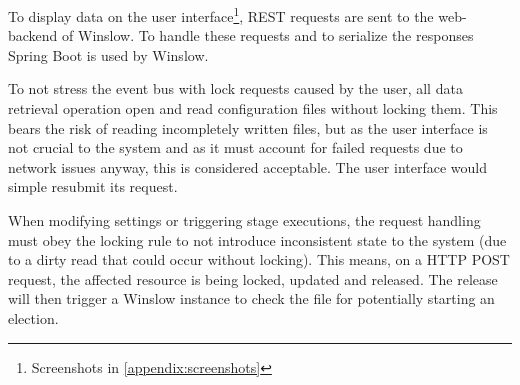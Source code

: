 To display data on the user interface\footnote{Screenshots in \autoref{appendix:screenshots}}, REST requests are sent to the web-backend of Winslow.
To handle these requests and to serialize the responses Spring Boot\cite{springboot} is used by Winslow.

To not stress the event bus with lock requests caused by the user, all data retrieval operation open and read configuration files without locking them.
This bears the risk of reading incompletely written files, but as the user interface is not crucial to the system and as it must account for failed requests due to network issues anyway, this is considered acceptable.
The user interface would simple resubmit its request.

When modifying settings or triggering stage executions, the request handling must obey the locking rule to not introduce inconsistent state to the system (due to a dirty read\cite[2]{berenson1995a} that could occur without locking).
This means, on a HTTP POST request, the affected resource is being locked, updated and released.
The release will then trigger a Winslow instance to check the file for potentially starting an election.






